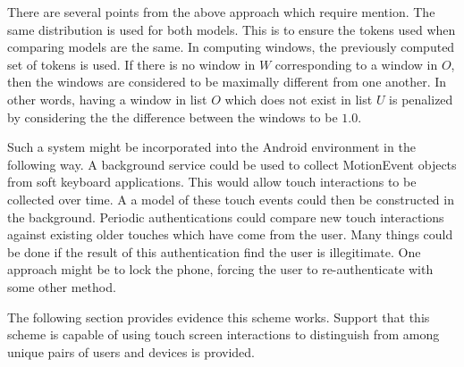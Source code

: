 %
There are several points from the above approach which require mention.
%
The same distribution is used for both models.
This is to ensure the tokens used when comparing models are the same.
%
In computing windows, 
the previously computed set of tokens is used.
%
%
If there is no window in $W$ corresponding to a window in $O$,
then the windows are considered to be maximally different from one another.
In other words,
having a window in list $O$ which does not exist in list $U$ is
penalized by considering the the difference between the windows to be $1.0$.



Such a system might be incorporated 
into the Android environment in the following way.
A background service could be used to collect MotionEvent objects
from soft keyboard applications.
This would allow touch interactions to be collected over time.
A a model of these touch events could then
be constructed in the background.
Periodic authentications could compare new touch interactions 
against existing older touches which have come from the user.
%
Many things could be done if the result of this authentication
find the user is illegitimate.
One approach might be to lock the phone,
forcing the user to re-authenticate with some other method.

The following section provides evidence this scheme
works.
Support that this scheme is capable of using
touch screen interactions to distinguish from
among unique pairs of users and devices is provided.